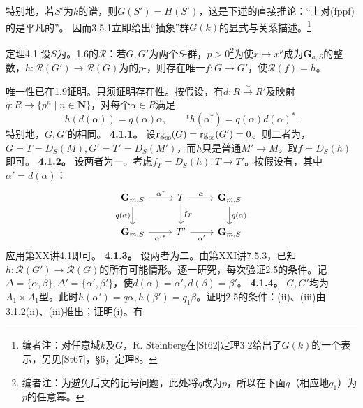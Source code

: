特别地，若$S'$为$k$的谱，则$G(S')=H(S')$，这是下述的直接推论：“上对(fppf)的是平凡的”。
因而3.5.1立即给出“抽象”群$G(k)$的显式与关系描述。\footnote{编者注：对任意域$k$及$G$，R. Steinberg在[St62]定理3.2给出了$G(k)$的一个表示，另见[St67]，\S6，定理8。}
\begin{SGAresult}{定理}{4.1}
设$S$为。1.6的$\mathcal R$：若$G,G'$为两个$S$-群，$p>0$\footnote{编者注：为避免后文的记号问题，此处将$q$改为$p$，所以在下面$q$（相应地$q_1$）为$p$的任意幂。}为使$x\mapsto x^p$成为$\mathbf G_{a,S}$的整数，$h:\mathcal R(G')\to\mathcal R(G)$为的$p$-，则存在唯一$f:G\to G'$，使$\mathcal R(f)=h$。
\end{SGAresult}
唯一性已在1.9证明。只须证明存在性。按假设，有$d:R\xrightarrow\sim R'$及映射$q:R\to\{p^n\mid n\in\mathbf N\}$，对每个$\alpha\in R$满足
\[h(d(\alpha))=q(\alpha)\alpha,\qquad{}^th(\alpha^*)=q(\alpha)d(\alpha)^*.\]
特别地，$G,G'$的相同。
\textbf{4.1.1。} 设$\operatorname{rg}_{\rm ss}(G)=\operatorname{rg}_{\rm ss}(G')=0$。则二者为，$G=T=D_S(M),G'=T'=D_S(M')$，而$h$只是普通$M'\to M$。取$f=D_S(h)$即可。
\textbf{4.1.2。} 设两者为一。考虑$f_T=D_S(h):T\to T'$。按假设有，其中$\alpha'=d(\alpha)$：
\[\begin{tikzcd}\mathbf G_{m,S}\arrow[r,"\alpha^*"]\arrow[d,"q(\alpha)"']&T\arrow[r,"\alpha"]\arrow[d,"f_T"]&\mathbf G_{m,S}\arrow[d,"q(\alpha)"]\\\mathbf G_{m,S}\arrow[r,"\alpha'^*"']&T'\arrow[r,"\alpha'"']&\mathbf G_{m,S}\end{tikzcd}\]
应用第XX讲4.1即可。
\textbf{4.1.3。} 设两者为二。由第XXI讲7.5.3，已知$h:\mathcal R(G')\to\mathcal R(G)$的所有可能情形。逐一研究，每次验证2.5的条件。记$\Delta=\{\alpha,\beta\},\Delta'=\{\alpha',\beta'\}$，使$d(\alpha)=\alpha',d(\beta)=\beta'$。
\textbf{4.1.4。} $G,G'$均为$A_1\times A_1$型。此时$h(\alpha')=q\alpha,h(\beta')=q_1\beta$。证明2.5的条件：(ii)、(iii)由3.1.2(ii)、(iii)推出；证明(i)。有
